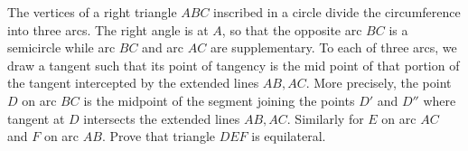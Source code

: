 The vertices of a right triangle $ABC$ inscribed in a circle divide the circumference into three arcs. The right angle is at $A$,  so that the opposite arc $BC$ is a semicircle while arc $BC$ and arc $AC$ are supplementary. To each of three arcs, we draw a tangent such that its point of tangency is the mid point of that portion of the tangent intercepted by the extended lines $AB,AC$. More precisely, the point $D$ on arc $BC$ is the midpoint of the segment joining the points $D'$ and $D''$ where tangent at $D$ intersects the extended lines $AB,AC$. Similarly for $E$ on arc $AC$ and $F$ on arc $AB$. Prove that triangle $DEF$ is equilateral.